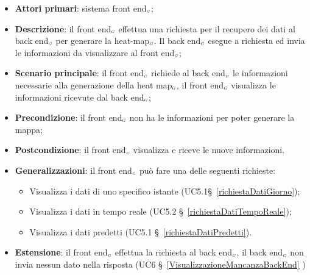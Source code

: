 \begin{itemize}
	\item \textbf{Attori primari}: sistema front end$_{\scaleto{G}{3pt}}$;
	\item \textbf{Descrizione}: il front end$_{\scaleto{G}{3pt}}$ effettua una richiesta per il recupero dei dati al back end$_{\scaleto{G}{3pt}}$ per generare la heat-map$_{\scaleto{G}{3pt}}$. Il back end$_{\scaleto{G}{3pt}}$ esegue a richiesta ed invia le informazioni da visualizzare al front end$_{\scaleto{G}{3pt}}$;
	\item \textbf{Scenario principale}: il front end$_{\scaleto{G}{3pt}}$ richiede al back end$_{\scaleto{G}{3pt}}$ le informazioni necessarie alla generazione della heat map$_{\scaleto{G}{3pt}}$, il front end$_{\scaleto{G}{3pt}}$ visualizza le informazioni ricevute dal back end$_{\scaleto{G}{3pt}}$;
	\item \textbf{Precondizione}: il front end$_{\scaleto{G}{3pt}}$ non ha le informazioni per poter generare la mappa;
	\item \textbf{Postcondizione}: il front end$_{\scaleto{G}{3pt}}$ visualizza e riceve le nuove informazioni. 
	\item \textbf{Generalizzazioni}: il front end$_{\scaleto{G}{3pt}}$ può fare una delle seguenti richieste:
	\begin{itemize}
		\item Visualizza i dati di uno specifico istante (UC5.1\S~\ref{richiestaDatiGiorno});
		\item Visualizza i dati in tempo reale (UC5.2 \S~\ref{richiestaDatiTempoReale});
		\item Visualizza i dati predetti (UC5.1 \S~\ref{richiestaDatiPredetti}).
	\end{itemize}
	\item \textbf{Estensione}: il front end$_{\scaleto{G}{3pt}}$ effettua la richiesta al back end$_{\scaleto{G}{3pt}}$, il back end$_{\scaleto{G}{3pt}}$ non invia nessun dato nella risposta (UC6 \S~\ref{VisualizzazioneMancanzaBackEnd} )
\end{itemize}

